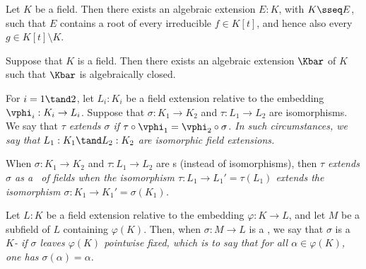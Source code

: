 \documentclass[a4paper]{article}
\begin{document}
\begin{tlemma}
  Let \( K \) be a field. Then there exists an algebraic extension \( E:K \), with \( K\sseq E \), such that \( E \) contains a root of every irreducible \( f\in K[t] \), and hence also every \( g\in K[t]\setminus K \).
\end{tlemma}

\begin{ttheorem}
  Suppose that \( K \) is a field.
  Then there exists an algebraic extension \( \Kbar \) of \( K \) such that \( \Kbar \) is algebraically closed.
\end{ttheorem}

\begin{tdefinition}
  For \( i = 1 \tand 2 \), let \( L_i : K_i \) be a field extension relative to the embedding \( \vphi_i : K_i\to L_i \).
  Suppose that \( \sigma : K_1\to K_2 \) and \( \tau:L_1\to L_2 \) are isomorphisms.
  We say that \it{\( \tau \) extends \( \sigma \)} if \( \tau\circ\vphi_1 = \vphi_2\circ\sigma \).
  In such circumstances, we say that \( L_1 : K_1 \tand L_2 : K_2 \) are \it{isomorphic field extensions}.
  \begin{center}
  \end{center}
  When \( \sigma:K_1\to K_2 \) and \( \tau:L_1\to L_2 \) are \homo s (instead of isomorphisms), then \it{\( \tau \) extends \( \sigma \) as a \homo~of fields} when the isomorphism \( \tau:L_1\to L_1' = \tau(L_1) \) extends the isomorphism \( \sigma:K_1\to K_1' = \sigma(K_1) \).
\end{tdefinition}

\begin{tdefinition}[\(K\)-\homo]
  Let \( L : K \) be a field extension relative to the embedding \( \varphi : K \to L \), and let \( M \) be a subfield of \( L \) containing \( \varphi(K) \).
  Then, when \( \sigma : M \to L \) is a \homo, we say that \( \sigma \) is a \it{\(K\)-\homo} if \( \sigma \) leaves \( \varphi(K) \) pointwise fixed, which is to say that for all \( \alpha \in \varphi(K) \), one has \( \sigma(\alpha) = \alpha \).
\end{tdefinition}
\end{document}
